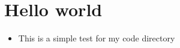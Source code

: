 \documentclass{article}
\begin{document}
\maketitle
\section{Hello world}
\begin{itemize}
    \item This is a simple test for my code directory
\end{itemize}
\end{document}
